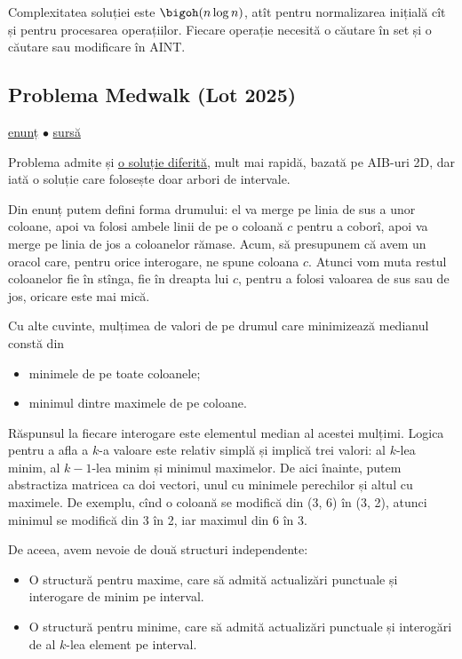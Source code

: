 Complexitatea soluției este $\bigoh(n \log n)$, atît pentru normalizarea inițială cît și pentru procesarea operațiilor. Fiecare operație necesită o căutare în set și o căutare sau modificare în AINT.

\subsection{Problema Medwalk (Lot 2025)}

\href{https://kilonova.ro/problems/3790}{enunț}
$\bullet$
\href{https://kilonova.ro/submissions/770116}{sursă}

Problema admite și \href{https://kilonova.ro/submissions/770475}{o soluție diferită}, mult mai rapidă, bazată pe AIB-uri 2D, dar iată o soluție care folosește doar arbori de intervale.

Din enunț putem defini forma drumului: el va merge pe linia de sus a unor coloane, apoi va folosi ambele linii de pe o coloană $c$ pentru a coborî, apoi va merge pe linia de jos a coloanelor rămase. Acum, să presupunem că avem un oracol care, pentru orice interogare, ne spune coloana $c$. Atunci vom muta restul coloanelor fie în stînga, fie în dreapta lui $c$, pentru a folosi valoarea de sus sau de jos, oricare este mai mică.

Cu alte cuvinte, mulțimea de valori de pe drumul care minimizează medianul constă din

\begin{itemize}
  \item minimele de pe toate coloanele;
  \item minimul dintre maximele de pe coloane.
\end{itemize}

Răspunsul la fiecare interogare este elementul median al acestei mulțimi. Logica pentru a afla a $k$-a valoare este relativ simplă și implică trei valori: al $k$-lea minim, al $k-1$-lea minim și minimul maximelor. De aici înainte, putem abstractiza matricea ca doi vectori, unul cu minimele perechilor și altul cu maximele. De exemplu, cînd o coloană se modifică din (3, 6) în (3, 2), atunci minimul se modifică din 3 în 2, iar maximul din 6 în 3.

De aceea, avem nevoie de două structuri independente:

\begin{itemize}
  \item O structură pentru maxime, care să admită actualizări punctuale și interogare de minim pe interval.
  \item O structură pentru minime, care să admită actualizări punctuale și interogări de al $k$-lea element pe interval.
\end{itemize}

